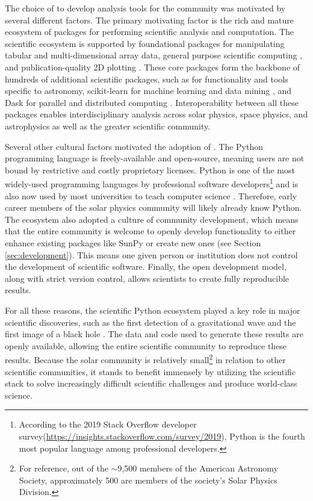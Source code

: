 The choice of \python to develop analysis tools for the community was motivated by several different factors.
The primary motivating factor is the rich and mature ecosystem of packages for performing scientific analysis and computation. 
The scientific \python ecosystem is supported by foundational packages for manipulating tabular \citep[\pandas,][]{pandas} and multi-dimensional array\citep[\numpy,][]{numpy} data, general purpose scientific computing \citep[\scipy,][]{scipy}, and publication-quality 2D plotting \citep[\matplotlib,][]{matplotlib}. 
These core packages form the backbone of hundreds of additional scientific \python packages, such as \astropypkg for functionality and tools specific to astronomy, scikit-learn for machine learning and data mining \citep{pedregosa11}, and Dask for parallel and distributed computing \citep{rocklin15}. Interoperability between all these packages enables interdisciplinary analysis across solar physics, space physics, and astrophysics as well as the greater scientific community.

Several other cultural factors motivated the adoption of \python.
The Python programming language is freely-available and open-source, meaning users are not bound by restrictive and costly proprietary licenses.
Python is one of the most widely-used programming languages by professional software developers\footnote{According to the 2019 Stack Overflow developer survey(\url{https://insights.stackoverflow.com/survey/2019}), Python is the fourth most popular language among professional developers.} and is also now used by most universities to teach computer science \citep{guo2014}.
Therefore, early career members of the solar physics community will likely already know Python.
The \python ecosystem also adopted a culture of community development, which means that the entire community is welcome to openly develop functionality to either enhance existing packages like SunPy or create new ones (see Section \ref{sec:development}).
This means one given person or institution does not control the development of scientific software.
Finally, the open development model, along with strict version control, allows scientists to create fully reproducible results.

For all these reasons, the scientific Python ecosystem played a key role in major scientific discoveries, such as the first detection of a gravitational wave \citep{ligo_scientific_collaboration_and_virgo_collaboration_observation_2016} and the first image of a black hole \citep{collaboration_first_2019}.
The data and code used to generate these results are openly available, allowing the entire scientific community to reproduce these results.
Because the solar community is relatively small\footnote{For reference, out of the $\sim$9,500 members of the American Astronomy Society, approximately 500 are members of the society's Solar Physics Division.} in relation to other scientific communities, it stands to benefit immensely by utilizing the \python scientific stack to solve increasingly difficult scientific challenges and produce world-class science.

